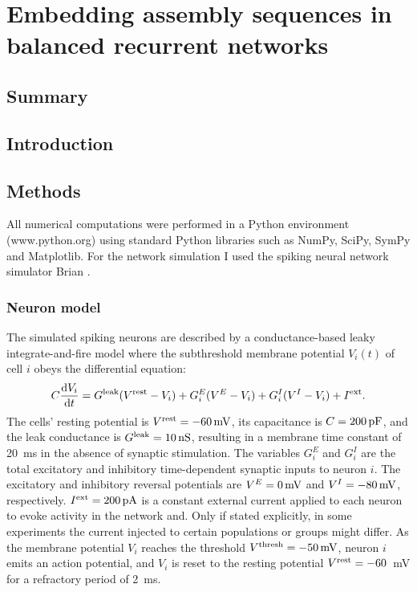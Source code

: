 \chapter{Embedding assembly sequences in balanced recurrent networks}

\section{Summary}
\section{Introduction}
\section{Methods}
  All numerical computations were performed in a Python environment (www.python.org) using standard Python libraries such as NumPy, SciPy, SymPy and Matplotlib. For the network simulation I used the spiking neural network simulator Brian \citep{Goodman2009}.

  \subsection{Neuron model}
  \label{sec:neuronmodel}
    The simulated spiking neurons are described by a conductance-based leaky integrate-and-fire model where the subthreshold membrane potential $V_i(t)$ of cell $i$ obeys the differential equation:
    \begin{equation}
      C\frac{{\rm d}V_i}{{\rm d}t} = G^{\rm leak}(V^{\rm rest}-V_i) + G_i^E(V^E-V_i) + G_i^I(V^I-V_i)  + I^{\rm ext} .
      \label{eq:if_neuron}
    \end{equation}
    The cells' resting potential is $V^{\rm rest}=-60\, {\rm mV}$, its capacitance is $C = 200 \, {\rm pF}$, and the leak conductance is $G^{\rm leak}=10{\rm\, nS}$, resulting in a membrane time constant of 20~ms in the absence of synaptic stimulation. The variables $G_i^E$ and $G_i^I$ are the total excitatory and inhibitory time-dependent synaptic inputs to neuron $i$. The excitatory and inhibitory reversal potentials are $V^E = 0\, {\rm mV}$ and $V^I=-80\, {\rm mV}$, respectively. $I^{\rm ext}=200 \rm\, pA$ is a constant external current applied to each neuron to evoke activity in the network and. Only if stated explicitly, in some experiments the current injected to certain populations or groups might differ. As the membrane potential $V_i$ reaches the threshold $V^{\rm thresh}=-50\, {\rm mV}$, neuron $i$ emits an action potential, and $V_i$ is reset to the resting potential $V^{\rm rest}=-60$~mV for a refractory period of 2~ms.%

